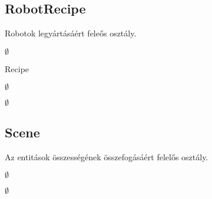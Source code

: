 \subsection{RobotRecipe}
\begin{class-template-responsibility}
Robotok legyártásáért feleős osztály.
\end{class-template-responsibility}
\begin{class-template-interface}
$\emptyset$
\end{class-template-interface}
\begin{class-template-baseclass}
Recipe
\end{class-template-baseclass}
\begin{class-template-attribute}
\item[] $\emptyset$
\end{class-template-attribute}
\begin{class-template-method}
\item[] $\emptyset$
\end{class-template-method}


\subsection{Scene}
\begin{class-template-responsibility}
Az entitások összességének összefogásáért felelős osztály. 
\end{class-template-responsibility}
\begin{class-template-interface}
$\emptyset$
\end{class-template-interface}
\begin{class-template-baseclass}
$\emptyset$
\end{class-template-baseclass}
\begin{class-template-attribute}
\end{class-template-attribute}
\begin{class-template-method}
\end{class-template-method}


